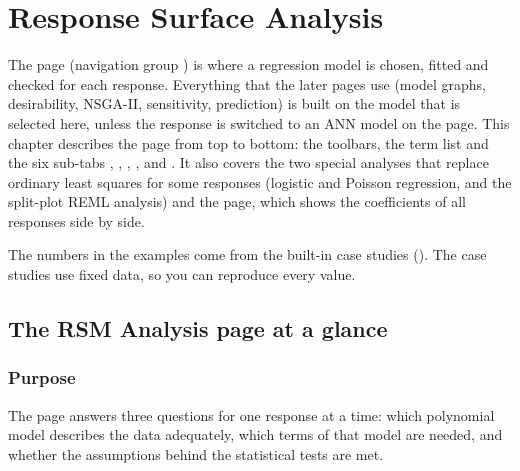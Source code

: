 \chapter{Response Surface Analysis}\label{sec:ch05-rsm}\label{chap:5}

The  page (navigation group ) is where a regression model is chosen,
fitted and checked for each response. Everything that the later pages use (model graphs, desirability,
NSGA-II, sensitivity, prediction) is built on the model that is selected here, unless the response is
switched to an ANN model on the  page. This chapter describes the page from top to bottom: the
toolbars, the term list and the six sub-tabs , , ,
,  and . It also covers the two special analyses that
replace ordinary least squares for some responses (logistic and Poisson regression, and the split-plot
REML analysis) and the  page, which shows the coefficients of all responses side by
side.

The numbers in the examples come from the built-in case studies (). The case studies use fixed data, so you can reproduce every value.

\section{The RSM Analysis page at a glance}\label{sec:ch05-page}

\subsection*{Purpose}
The page answers three questions for one response at a time: which polynomial model describes the data
adequately, which terms of that model are needed, and whether the assumptions behind the statistical tests
are met.

